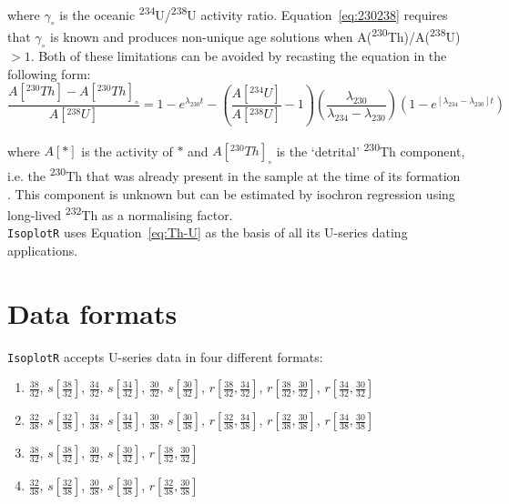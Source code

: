 \begin{refsection}
\noindent where $\gamma_\circ$ is the oceanic
\textsuperscript{234}U/\textsuperscript{238}U activity ratio.
Equation~\ref{eq:230238} requires that $\gamma_\circ$ is known and
produces non-unique age solutions when
A(\textsuperscript{230}Th)/A(\textsuperscript{238}U)$>1$. Both of
these limitations can be avoided by recasting the equation in the
following form:
\begin{equation}
  \frac{A[{}^{230}Th] - A[{}^{230}Th]_\circ}{A[{}^{238}U]} =
  1 - e^{\lambda_{230}t} -
  \left(\frac{A[{}^{234}U]}{A[{}^{238}U]}-1\right)
  \left(\frac{\lambda_{230}}{\lambda_{234}-\lambda_{230}}\right)
  \left(1-e^{[\lambda_{234}-\lambda_{230}]t}\right)
  \label{eq:Th-U}
\end{equation}

\noindent where $A[\ast]$ is the activity of $\ast$ and
$A[{}^{230}Th]_\circ$ is the `detrital' \textsuperscript{230}Th
component, i.e. the \textsuperscript{230}Th that was already present
in the sample at the time of its formation \citep{kaufman1965,
  ludwig2003b}. This component is unknown but can be estimated by
isochron regression using long-lived \textsuperscript{232}Th as a
normalising factor.\\

\texttt{IsoplotR} uses Equation~\ref{eq:Th-U} as the basis of all its
U-series dating applications.

\section{Data formats}

\texttt{IsoplotR} accepts U-series data in four different formats:

\begin{enumerate}
\item $\frac{38}{32}$, $s\!\left[\frac{38}{32}\right]$,
  $\frac{34}{32}$, $s\!\left[\frac{34}{32}\right]$,
  $\frac{30}{32}$, $s\!\left[\frac{30}{32}\right]$,
  $r\!\left[\frac{38}{32},\frac{34}{32}\right]$,
  $r\!\left[\frac{38}{32},\frac{30}{32}\right]$,
  $r\!\left[\frac{34}{32},\frac{30}{32}\right]$
\item $\frac{32}{38}$, $s\!\left[\frac{32}{38}\right]$,
  $\frac{34}{38}$, $s\!\left[\frac{34}{38}\right]$,
  $\frac{30}{38}$, $s\!\left[\frac{30}{38}\right]$,
  $r\!\left[\frac{32}{38},\frac{34}{38}\right]$,
  $r\!\left[\frac{32}{38},\frac{30}{38}\right]$,
  $r\!\left[\frac{34}{38},\frac{30}{38}\right]$
\item $\frac{38}{32}$, $s\!\left[\frac{38}{32}\right]$,
  $\frac{30}{32}$, $s\!\left[\frac{30}{32}\right]$,
  $r\!\left[\frac{38}{32},\frac{30}{32}\right]$
\item $\frac{32}{38}$, $s\!\left[\frac{32}{38}\right]$,
  $\frac{30}{38}$, $s\!\left[\frac{30}{38}\right]$,
  $r\!\left[\frac{32}{38},\frac{30}{38}\right]$
\end{enumerate}


\end{refsection}
